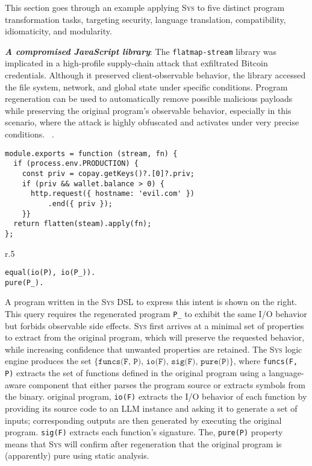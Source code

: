 \documentclass[sigplan]{acmart}
\newcommand{\sys}{{\scshape Sys}\xspace}
\newcommand{\heading}[1]{\vspace{2pt}\noindent\textbf{\emph{#1}}:\enspace}
\newcommand{\ttt}[1]{\texttt{#1}}
\begin{document}
This section goes through an example applying \sys
to five distinct program transformation tasks, 
targeting security, language translation, compatibility,
idiomaticity, and modularity.

\heading{A compromised JavaScript library}
The \texttt{flatmap-stream} library was implicated in a high-profile
supply-chain attack that exfiltrated Bitcoin credentials.
Although it preserved
client-observable behavior, the library accessed the file system, network, and
global state under specific conditions.
Program regeneration can be used to automatically remove possible malicious payloads
while preserving the original program's observable behavior,
especially in this scenario, where the attack is highly obfuscated and 
activates under very precise conditions.
~\cite{harp:ccs:2021}.
\begin{verbatim}
module.exports = function (stream, fn) {
  if (process.env.PRODUCTION) {
    const priv = copay.getKeys()?.[0]?.priv;
    if (priv && wallet.balance > 0) {
      http.request({ hostname: 'evil.com' })
          .end({ priv });
    }}
  return flatten(steam).apply(fn);
};
\end{verbatim}

\begin{wrapfigure}[3]{r}{.5\columnwidth}
\vspace{-10pt}
\begin{verbatim}
equal(io(P), io(P_)).
pure(P_).
\end{verbatim}
\end{wrapfigure}
A program written in the \sys DSL to express this intent is shown on the right.
This query requires the regenerated program \ttt{P_} to exhibit the same I/O behavior
but forbids observable side effects.
\sys first arrives at a minimal set of properties to extract from the
original program, which will preserve the requested behavior, while increasing confidence that unwanted properties are retained.
The \sys logic engine produces the set $\{\texttt{funcs(F, P), io(F), sig(F), pure(P)}\}$, where
\texttt{funcs(F, P)} extracts the set of functions defined in the original program
using a language-aware component that either parses the program source or extracts
symbols from the binary.
original program, \texttt{io(F)} extracts the I/O behavior of each function
by providing its source code to an LLM instance and asking it to generate a set of
inputs; corresponding outputs are then generated by executing the original program.
\texttt{sig(F)} extracts each function's signature.
The, \texttt{pure(P)} property means that \sys will confirm after regeneration that the original program is (apparently) pure
using static analysis.
\end{document}

